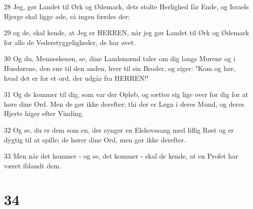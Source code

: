 \par 28 Jeg, gør Landet til Ørk og Ødemark, dets stolte Herlighed får Ende, og Israels Bjerge skal ligge øde, så ingen færdes der;
\par 29 og de, skal kende, at Jeg er HERREN, når jeg gør Landet til Ørk og Ødemark for alle de Vederstyggeligheder, de har øvet.
\par 30 Og du, Menneskesøn, se, dine Landsmænd taler om dig langs Murene og i Husdørene, den ene til den anden, hver til sin Broder, og siger: "Kom og hør, hvad det er for et ord, der udgår fra HERREN!"
\par 31 Og de kommer til dig, som var der Opløb, og sætter sig lige over for dig for at høre dine Ord. Men de gør ikke derefter; thi der er Løgn i deres Mund, og deres Hjerte higer efter Vinding.
\par 32 Og se, du er dem som en, der synger en Elskovssang med liflig Røst og er dygtig til at spille; de hører dine Ord, men gør ikke derefter.
\par 33 Men når det kommer - og se, det kommer - skal de kende, at en Profet har været iblandt dem.

\chapter{34}

